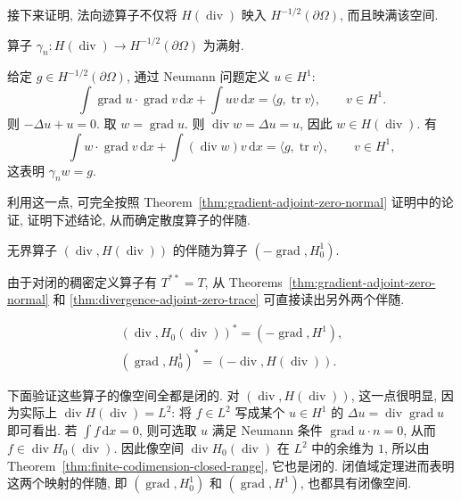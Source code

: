 接下来证明, 法向迹算子不仅将 $H(\operatorname{div})$ 映入 $H^{-1/2}(\partial\Omega)$, 而且映满该空间.

\begin{Theorem}\label{thm:normal-trace-surjective}
算子 $\gamma_n:H(\operatorname{div})\to H^{-1/2}(\partial\Omega)$ 为满射.
\end{Theorem}

\begin{Proof}
给定 $g\in H^{-1/2}(\partial\Omega)$, 通过 Neumann 问题定义 $u\in H^1$:
\[
\int\operatorname{grad}u\cdot\operatorname{grad}v\,\mathrm{d}x+\int uv\,\mathrm{d}x=\langle g,\operatorname{tr}v\rangle,\qquad v\in H^1.
\]
则 $-\Delta u+u=0$. 取 $w=\operatorname{grad}u$. 则 $\operatorname{div}w=\Delta u=u$, 因此 $w\in H(\operatorname{div})$. 有
\[
\int w\cdot\operatorname{grad}v\,\mathrm{d}x+\int(\operatorname{div}w)v\,\mathrm{d}x=\langle g,\operatorname{tr}v\rangle,\qquad v\in H^1,
\]
这表明 $\gamma_n w=g$.
\end{Proof}

利用这一点, 可完全按照 Theorem~\ref{thm:gradient-adjoint-zero-normal} 证明中的论证, 证明下述结论, 从而确定散度算子的伴随.

\begin{Theorem}\label{thm:divergence-adjoint-zero-trace}
无界算子 $(\operatorname{div},H(\operatorname{div}))$ 的伴随为算子 $(-\operatorname{grad}, H_0^1)$.
\end{Theorem}

由于对闭的稠密定义算子有 $T^{**}=T$, 从 Theorems~\ref{thm:gradient-adjoint-zero-normal} 和 \ref{thm:divergence-adjoint-zero-trace} 可直接读出另外两个伴随.

\begin{Theorem}\label{thm:reverse-gradient-divergence-adjoints}
\[
\begin{gathered}
(\operatorname{div}, H_0(\operatorname{div}))^*=(-\operatorname{grad},H^1),\\
(\operatorname{grad}, H_0^1)^*=(-\operatorname{div},H(\operatorname{div})).
\end{gathered}
\]
\end{Theorem}

下面验证这些算子的像空间全都是闭的. 对 $(\operatorname{div},H(\operatorname{div}))$, 这一点很明显, 因为实际上 $\operatorname{div}H(\operatorname{div})=L^2$: 将 $f\in L^2$ 写成某个 $u\in H^1$ 的 $\Delta u=\operatorname{div}\operatorname{grad}u$ 即可看出. 若 $\int f\,\mathrm{d}x=0$, 则可选取 $u$ 满足 Neumann 条件 $\operatorname{grad}u\cdot n=0$, 从而 $f\in\operatorname{div} H_0(\operatorname{div})$. 因此像空间 $\operatorname{div} H_0(\operatorname{div})$ 在 $L^2$ 中的余维为 $1$, 所以由 Theorem~\ref{thm:finite-codimension-closed-range}, 它也是闭的. 闭值域定理进而表明这两个映射的伴随, 即 $(\operatorname{grad}, H_0^1)$ 和 $(\operatorname{grad},H^1)$, 也都具有闭像空间.

